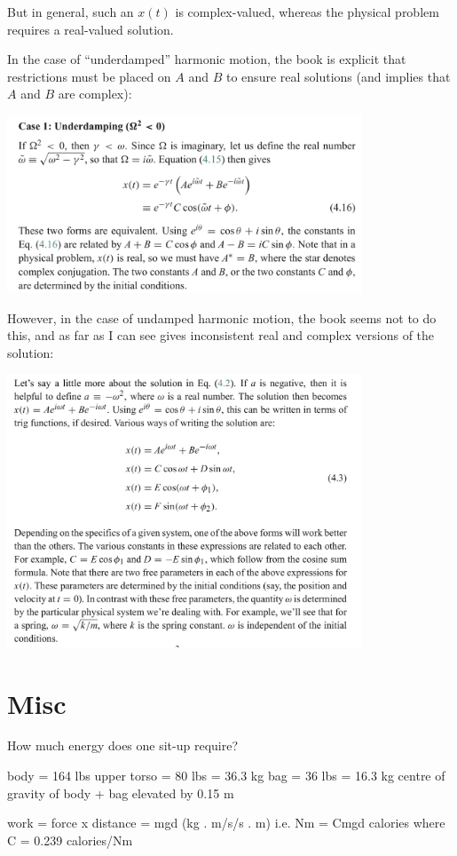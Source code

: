 But in general, such an $x(t)$ is complex-valued, whereas the physical problem requires a
real-valued solution.

In the case of ``underdamped'' harmonic motion, the book is explicit that restrictions must be
placed on $A$ and $B$ to ensure real solutions (and implies that $A$ and $B$ are complex):

\begin{mdframed}
  \includegraphics[width=300pt]{img/physics--classical-mechanics--morin--questions--4-3-underdamped-shm.png}
\end{mdframed}

However, in the case of undamped harmonic motion, the book seems not to do this, and as far as I can
see gives inconsistent real and complex versions of the solution:

\begin{mdframed}
  \includegraphics[width=300pt]{img/physics--classical-mechanics--morin--questions--4-3-undamped-shm.png}
\end{mdframed}


\section{Misc}
How much energy does one sit-up require?

body = 164 lbs
upper torso = 80 lbs = 36.3 kg
bag = 36 lbs = 16.3 kg
centre of gravity of body + bag elevated by 0.15 m

work = force x distance
= mgd (kg . m/s/s . m) i.e. Nm
= Cmgd calories where C = 0.239 calories/Nm
